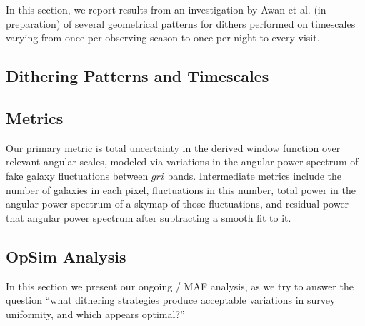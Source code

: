 In this section, we report results from an investigation by Awan et al. (in preparation) of several geometrical patterns for dithers performed on timescales varying from once per observing season to once per night to every visit.  



\subsection{Dithering Patterns and Timescales}
\label{sec:\secname:strategies}



\subsection{Metrics}
\label{sec:\secname:metrics}


Our primary metric is total uncertainty in the derived window function over relevant angular scales, modeled via variations in the angular power spectrum of fake galaxy fluctuations between $gri$ bands.  
Intermediate metrics include the number of galaxies in 
each pixel, fluctuations in this number, total power in the angular power spectrum of a skymap of those fluctuations, and residual power that angular power spectrum after subtracting a smooth fit to it.  




\subsection{OpSim Analysis}
\label{sec:\secname:analysis}


In this section we present our ongoing \OpSim / MAF
analysis, as we try to
answer the question ``what dithering strategies produce acceptable variations in survey uniformity, and which appears optimal?''

